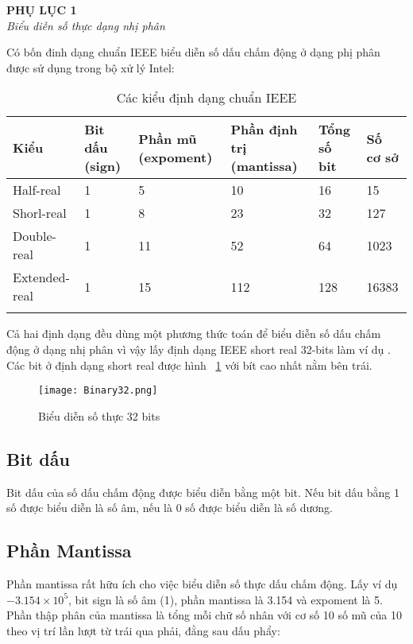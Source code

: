 \begin{center}
	\begin{huge}
			\textbf{PHỤ LỤC 1}\\
			\textit{Biểu diễn số thực dạng nhị phân}
	\end{huge}
\end{center}

Có bốn đinh dạng chuẩn IEEE biểu diễn số dấu chấm động ở dạng phị phân được sử dụng trong bộ xử lý Intel:
\begin{longtable}{|l|m{2cm}|m{3cm}|m{3cm}|l|l|}
	\hline
		Kiểu & Bit dấu (sign) & Phần mũ (expoment) &Phần định trị (mantissa) & Tổng số bit & Số cơ sở \\
	\hline
	\hline
			Half-real	&1&	5 &	10	&16	 &	15\\
	\hline
			Shorl-real &	1	& 8	 & 23	 & 32	&	127\\
	\hline
			Double-real &1 &	11 &52 &	64	&	1023\\
	\hline
		Extended-real&	1 &	15 &	112 &	128 &	16383\\
	\hline
	\caption{Các kiểu định dạng chuẩn IEEE}
\end{longtable}

Cả hai định dạng đều dùng một phương thức toán để biểu diễn số dấu chấm động ở dạng nhị phân vì vậy lấy định dạng IEEE short real 32-bits làm ví dụ . Các bit ở định dạng short real được hình ~\ref{fig:Bianry32} với bít cao nhất nằm bên trái.

		\begin{center}
			\begin{figure}[htp]
				\begin{center}
					\texttt{[image: Binary32.png]}
				\end{center}
				\caption{Biểu diễn số thực 32 bits}	
					\label{fig:Bianry32}		
			\end{figure}
		\end{center}			

\subsection*{Bit dấu}
 Bit dấu của số dấu chấm động được biểu diễn bằng một bit. Nếu bit dấu bằng 1 số được biểu diễn là số âm, nếu là 0 số được biểu diễn là số dương. \\
 
 \subsection*{Phần Mantissa}
 	Phần mantissa rất hữu ích cho việc biểu diễn số thực dấu chấm động. Lấy ví dụ $-3.154 \times 10^5$, bit sign là số âm (1), phần mantissa là 3.154 và expoment là 5. Phần thập phân của mantissa là tổng mỗi chữ số nhân với cơ số 10 số mũ của 10 theo vị trí lần lượt từ trái qua phải, đằng sau dấu phẩy:
 	
